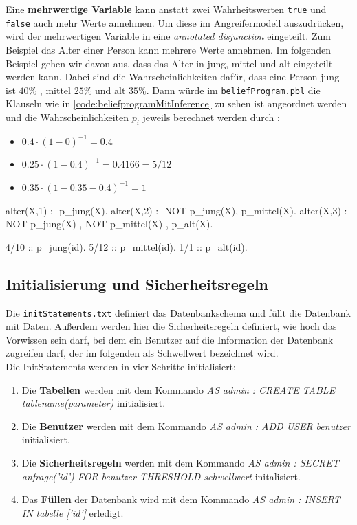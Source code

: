 \documentclass[german,version-2020-11]{uzl-thesis}
\begin{document}
Eine \textbf{mehrwertige Variable} kann anstatt zwei Wahrheitswerten \texttt{true} und \texttt{false} auch mehr Werte annehmen.
Um diese im Angreifermodell auszudrücken, wird der mehrwertigen Variable in eine \textit{annotated disjunction} eingeteilt. Zum Beispiel das Alter einer Person kann mehrere Werte annehmen. Im folgenden Beispiel gehen wir davon aus, dass das Alter in jung, mittel und alt eingeteilt werden kann. Dabei sind die Wahrscheinlichkeiten dafür, dass eine Person jung ist $40\%$ , mittel $25\%$ und alt $35\%$. Dann würde im \texttt{beliefProgram.pbl} die Klauseln wie in \autoref{code:beliefprogramMitInference} zu sehen ist angeordnet werden und die Wahrscheinlichkeiten $p_i$ jeweils berechnet werden durch : 
\begin{itemize}
	\item $0.4 \cdot (1- 0)^{-1} = 0.4 $
	\item  $0.25 \cdot (1 - 0.4)^{-1} = 0.4166 = 5/12 $
	\item $ 0.35 \cdot (1 - 0.35 - 0.4)^{-1} = 1 $
\end{itemize}

\begin{Pseudocode}[caption={\texttt{beliefProgram.pbl} für Knoten mit Abhängigkeiten}, label={code:beliefprogramMitInference}]
alter(X,1) :- p_jung(X).
alter(X,2) :- NOT p_jung(X), p_mittel(X).
alter(X,3) :- NOT p_jung(X) , NOT p_mittel(X) , p_alt(X).

4/10 :: p_jung(id).
5/12 :: p_mittel(id).
1/1 :: p_alt(id).
\end{Pseudocode} 


\subsection{Initialisierung und Sicherheitsregeln}
Die \texttt{initStatements.txt} definiert das Datenbankschema und füllt die Datenbank mit Daten. Außerdem werden hier die Sicherheitsregeln definiert, wie hoch das Vorwissen sein darf, bei dem ein Benutzer auf die Information der Datenbank zugreifen darf, der im folgenden als Schwellwert bezeichnet wird. \\ 
Die InitStatements werden in vier Schritte initialisiert:
\begin{enumerate}
	\item Die \textbf{Tabellen } werden mit dem Kommando \textit{AS admin : CREATE TABLE tablename(parameter)} initialisiert. 
	\item  Die \textbf{Benutzer} werden mit dem Kommando \textit{AS admin : ADD USER benutzer} initialisiert. 
	\item Die \textbf{Sicherheitsregeln}  werden mit dem Kommando \textit{AS admin : SECRET anfrage('id') FOR benutzer THRESHOLD schwellwert} initalisiert.
	\item Das \textbf{Füllen} der Datenbank wird mit dem Kommando \textit{AS admin : INSERT IN tabelle ['id']} erledigt.
\end{enumerate} 
\end{document}
